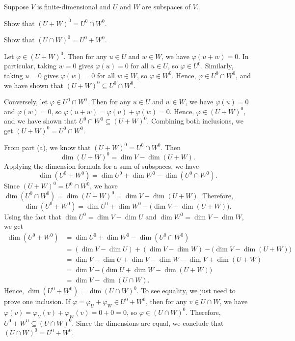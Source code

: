 \begin{exercise}
Suppose $V$ is finite-dimensional and $U$ and $W$ are subspaces of $V$.
\begin{parts}
\item Show that $(U+W)^0=U^0\cap W^0$.
\item Show that $(U\cap W)^0=U^0+W^0$.
\end{parts}
\end{exercise}
\begin{solution}\leavevmode
\begin{parts}
\item Let $\varphi\in(U+W)^0$. Then for any $u\in U$ and $w\in W$, we have
  $\varphi(u+w)=0$. In particular, taking $w=0$ gives $\varphi(u)=0$ for all
  $u\in U$, so $\varphi\in U^0$. Similarly, taking $u=0$ gives $\varphi(w)=0$
  for all $w\in W$, so $\varphi\in W^0$. Hence, $\varphi\in U^0\cap W^0$, and we
  have shown that $(U+W)^0\subseteq U^0\cap W^0$.

  Conversely, let $\varphi\in U^0\cap W^0$. Then for any $u\in U$ and $w\in W$,
  we have $\varphi(u)=0$ and $\varphi(w)=0$, so
  $\varphi(u+w)=\varphi(u)+\varphi(w)=0$. Hence, $\varphi\in(U+W)^0$, and we
  have shown that $U^0\cap W^0\subseteq(U+W)^0$. Combining both inclusions, we
  get $(U+W)^0=U^0\cap W^0$.
\item From part (a), we know that $(U+W)^0=U^0\cap W^0$. Then
  \[ \dim(U+W)^0 = \dim V-\dim(U+W). \]
  Applying the dimension formula for a sum of subspaces, we have
  \[ \dim(U^0+W^0) = \dim U^0+\dim W^0-\dim(U^0\cap W^0). \]
  Since $(U+W)^0=U^0\cap W^0$, we have
  $\dim(U^0\cap W^0)=\dim(U+W)^0=\dim V-\dim(U+W)$. Therefore,
  \[ \dim(U^0+W^0) = \dim U^0+\dim W^0-\bigl(\dim V-\dim(U+W)\bigr). \]
  Using the fact that $\dim U^0=\dim V-\dim U$ and $\dim W^0=\dim V-\dim W$, we
  get
  \begin{align*}
  \dim(U^0+W^0)
   &= \dim U^0+\dim W^0-\dim(U^0\cap W^0)\\
   &= (\dim V-\dim U)+(\dim V-\dim W)-\bigl(\dim V-\dim(U+W)\bigr)\\
   &= \dim V-\dim U+\dim V-\dim W-\dim V+\dim(U+W)\\
   &= \dim V-\bigl(\dim U+\dim W-\dim(U+W)\bigr)\\
   &= \dim V-\dim(U\cap W).
  \end{align*}
  Hence, $\dim(U^0+W^0)=\dim(U\cap W)^0$. To see equality, we just need to
  prove one inclusion. If $\varphi=\varphi_U+\varphi_W\in U^0+W^0$, then for any
  $v\in U\cap W$, we have $\varphi(v)=\varphi_U(v)+\varphi_W(v)=0+0=0$, so
  $\varphi\in(U\cap W)^0$. Therefore, $U^0+W^0\subseteq(U\cap W)^0$. Since the
  dimensions are equal, we conclude that $(U\cap W)^0=U^0+W^0$.
\end{parts}
\end{solution}

